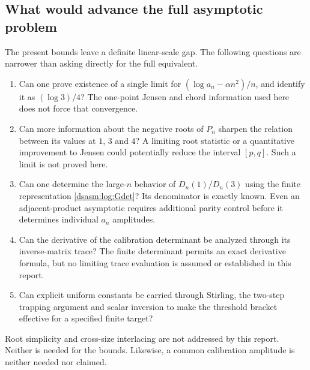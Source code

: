 \documentclass[11pt,letterpaper]{article}
\theoremstyle{remark}\newtheorem{remark}[theorem]{Remark}
\begin{document}
\subsection{What would advance the full asymptotic problem}
The present bounds leave a definite linear-scale gap. The following
questions are narrower than asking directly for the full equivalent.
\begin{enumerate}
\item Can one prove existence of a single limit for
$(\log a_n-\alpha n^2)/n$, and identify it as $(\log3)/4$?
The one-point Jensen and chord information used here does not force
that convergence.
\item Can more information about the negative roots of $P_n$ sharpen
the relation between its values at $1$, $3$ and $4$? A limiting root
statistic or a quantitative improvement to Jensen could potentially
reduce the interval $[p,q]$. Such a limit is not proved here.
\item Can one determine the large-$n$ behavior of
$D_n(1)/D_n(3)$ using the finite representation \eqref{dsasm:log:Gdet}?
Its denominator is exactly known. Even an adjacent-product
asymptotic requires additional parity control before it determines
individual $a_n$ amplitudes.
\item Can the derivative of the calibration determinant be analyzed
through its inverse-matrix trace? The finite determinant permits an
exact derivative formula, but no limiting trace evaluation is assumed
or established in this report.
\item Can explicit uniform constants be carried through Stirling,
the two-step trapping argument and scalar inversion to make the
threshold bracket effective for a specified finite target?
\end{enumerate}
Root simplicity and cross-size interlacing are not addressed by this
report. Neither is needed for the bounds. Likewise, a common
calibration amplitude is neither needed nor claimed.
\end{document}
